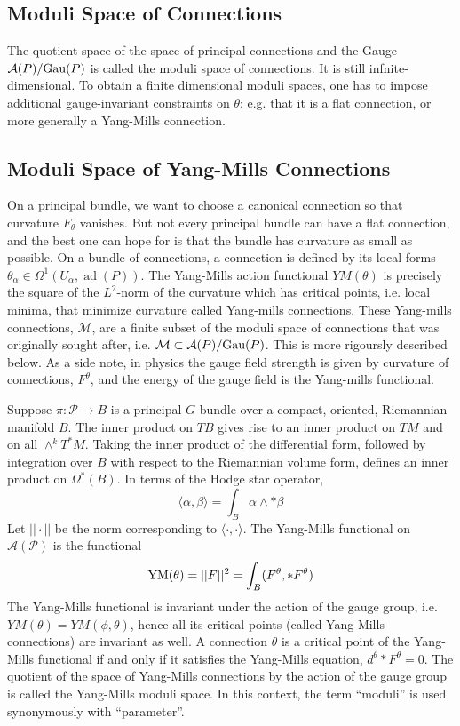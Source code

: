 \documentclass{article}
\theoremstyle{definition}
\begin{document}
    \subsection{Moduli Space of Connections}
    The quotient space of the space of principal connections and the Gauge  $\mathcal A(P) / \hbox{Gau}(P)$ is called the moduli space of connections. It is still infnite-dimensional. To obtain a finite dimensional moduli spaces, one has to impose additional gauge-invariant constraints on $\theta$: e.g. that it is a flat connection, or more generally a Yang-Mills connection. 
    
    \subsection{Moduli Space of Yang-Mills Connections}
    
    On a principal bundle, we want to choose a canonical connection so that curvature $F_\theta$ vanishes. But not every principal bundle can have a flat connection, and the best one can hope for is that the bundle has curvature as small as possible. On a bundle of connections, a connection is defined by its local forms ${\displaystyle \theta_{\alpha }\in \Omega ^{1}(U_{\alpha },\operatorname {ad} (P))}$. The Yang-Mills action functional $YM(\theta)$ is precisely the square of the ${\displaystyle L^{2}}$-norm of the curvature which has critical points, i.e. local minima, that minimize curvature called Yang-mills connections. These Yang-mills connections, $\mathcal M$, are a finite subset of the moduli space of connections that was originally sought after, i.e. $\mathcal M \subset \mathcal A(P) / \hbox{Gau}(P)$. This is more rigoursly described below. As a side note, in physics the gauge field strength is given by curvature of connections, $F^\theta$, and the energy of the gauge field is the Yang-mills functional.
    
    
    Suppose $\pi : \mathcal P \rightarrow B$ is a principal $G$-bundle over a compact, oriented, Riemannian manifold $B$. The inner product on $T B$ gives rise to an inner product on $T M$ and on all $ \wedge^k T^*M$. Taking the inner product of the differential form, followed by integration over $B$ with respect to the Riemannian volume form, defines an inner product on $\Omega^* (B)$. In terms of the Hodge star operator, 
    \[
        \langle \alpha, \beta \rangle = \int_B \alpha \wedge  * \beta
    \]
    Let $|| \cdot ||$ be the norm corresponding to $\langle \cdot, \cdot \rangle$. The Yang-Mills functional on $\mathcal A(\mathcal P)$ is the functional 
    \[
        \hbox{YM}(\theta) = ||F ||^2 = \int_B (F^\theta, * F^\theta)
    \]
    The Yang-Mills functional is invariant under the action of the gauge group, i.e. $YM(\theta) = YM(\phi,\theta)$, hence all its critical points (called Yang-Mills connections) are invariant as well. A connection $\theta$ is a critical point of the Yang-Mills functional if and only if it satisfies the Yang-Mills equation, $d^\theta * F^\theta = 0$. The quotient of the space of Yang-Mills connections by the action of the gauge group is called the Yang-Mills moduli space. In this context, the term ``moduli'' is used synonymously with ``parameter''. 
    
\end{document}

